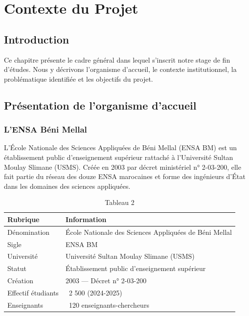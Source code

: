 \chapter{Contexte du Projet}

\section{Introduction}

Ce chapitre présente le cadre général dans lequel s'inscrit notre stage de fin d'études. Nous y décrivons l'organisme d'accueil, le contexte institutionnel, la problématique identifiée et les objectifs du projet.

\section{Présentation de l'organisme d'accueil}

\subsection{L'ENSA Béni Mellal}

L'École Nationale des Sciences Appliquées de Béni Mellal (ENSA BM) est un établissement public d'enseignement supérieur rattaché à l'Université Sultan Moulay Slimane (USMS). Créée en 2003 par décret ministériel n° 2-03-200, elle fait partie du réseau des douze ENSA marocaines et forme des ingénieurs d'État dans les domaines des sciences appliquées.

\begin{table}[htbp]
\centering
\begin{tabular}{|l|l|}
\hline
Rubrique & Information \\
\hline
Dénomination & École Nationale des Sciences Appliquées de Béni Mellal \\
\hline
Sigle & ENSA BM \\
\hline
Université & Université Sultan Moulay Slimane (USMS) \\
\hline
Statut & Établissement public d'enseignement supérieur \\
\hline
Création & 2003 — Décret n° 2-03-200 \\
\hline
Effectif étudiants & ~2 500 (2024-2025) \\
\hline
Enseignants & ~120 enseignants-chercheurs \\
\hline
\end{tabular}
\caption{Tableau 2}
\label{tab:table_2}
\end{table}


